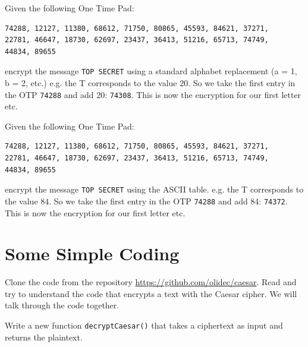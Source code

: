 \documentclass[11pt,a4paper]{report}
\begin{document}
\begin{ex}
Given the following One Time Pad: 
\begin{verbatim}
74288, 12127, 11380, 68612, 71750, 80865, 45593, 84621, 37271,
22781, 46647, 18730, 62697, 23437, 36413, 51216, 65713, 74749,
44834, 89655
\end{verbatim}
encrypt the message \verb|TOP SECRET|
using a standard alphabet replacement (a = 1, b = 2, etc.) e.g. the T corresponds to the value $20$.
So we take the first entry in the OTP \verb|74288| and add 20: \verb|74308|.
This is now the encryption for our first letter etc.
\end{ex}


\begin{ex}
Given the following One Time Pad: 
\begin{verbatim}
74288, 12127, 11380, 68612, 71750, 80865, 45593, 84621, 37271,
22781, 46647, 18730, 62697, 23437, 36413, 51216, 65713, 74749,
44834, 89655
\end{verbatim}
encrypt the message \verb|TOP SECRET|
using the ASCII table. e.g. the T corresponds to the value $84$.
So we take the first entry in the OTP \verb|74288| and add 84: \verb|74372|.
This is now the encryption for our first letter etc.
\end{ex}

\section{Some Simple Coding}

\begin{ex}
Clone the code from the repository \url{https://github.com/olidec/caesar}.
Read and try to understand the code that encrypts a text with the Caesar cipher.
We will talk through the code together.
\end{ex}

\begin{ex}
Write a new function \verb|decryptCaesar()|
that takes a ciphertext as input and returns the plaintext.
\end{ex}
\end{document}
